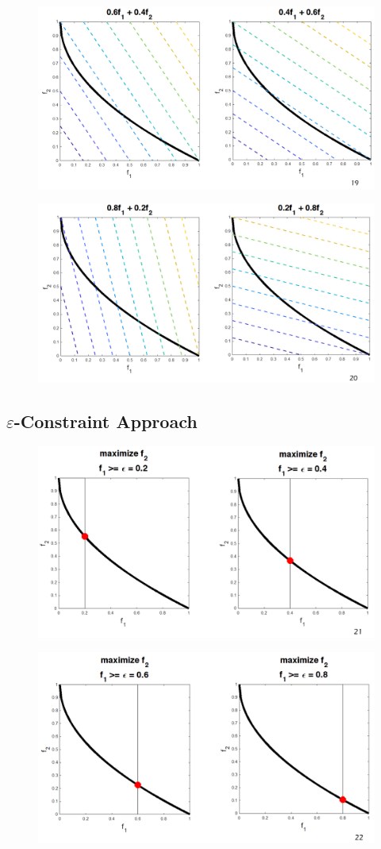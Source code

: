 \documentclass{book}
\begin{document}
\begin{figure}[H]
    \centering
    \includegraphics[width=0.75\linewidth]{images/GA-7-8_19.png}
\end{figure}

\begin{figure}[H]
    \centering
    \includegraphics[width=0.75\linewidth]{images/GA-7-8_20.png}
\end{figure}

\subsection{$\varepsilon$-Constraint Approach}

\begin{figure}[H]
    \centering
    \includegraphics[width=0.75\linewidth]{images/GA-7-8_21.png}
\end{figure}

\begin{figure}[H]
    \centering
    \includegraphics[width=0.75\linewidth]{images/GA-7-8_22.png}
\end{figure}
\end{document}
